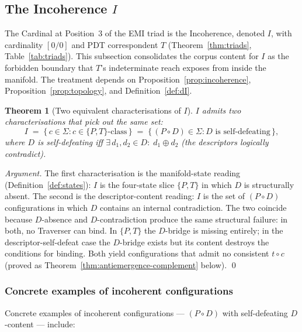 \documentclass[11pt,a4paper]{article}
\newtheorem{theorem}{Theorem}[section]
\theoremstyle{definition}
\theoremstyle{remark}
\begin{document}
\subsection{The Incoherence $I$}\label{subsec:incoherence}

The Cardinal at Position~3 of the EMI triad is the Incoherence, denoted $I$, with cardinality $[0/0]$ and PDT correspondent $T$ (Theorem~\ref{thm:triads}, Table~\ref{tab:triads}). This subsection consolidates the corpus content for $I$ as the forbidden boundary that $T$'s indeterminate reach exposes from inside the manifold. The treatment depends on Proposition~\ref{prop:incoherence}, Proposition~\ref{prop:topology}, and Definition~\ref{def:dI}.

\begin{theorem}[Two equivalent characterisations of $I$]\label{thm:incoherence-equivalence}
$I$ admits two characterisations that pick out the same set:
\[
I \;=\; \{\,c \in \Sigma : c \in \{P,T\}\text{-class}\,\} \;=\; \{\,(P\circ D) \in \Sigma : D \text{ is self-defeating}\,\},
\]
where $D$ is self-defeating iff $\exists\, d_{1}, d_{2} \in D :\; d_{1} \oplus d_{2}$ (the descriptors logically contradict).
\end{theorem}

\begin{proof}[Argument]
The first characterisation is the manifold-state reading (Definition~\ref{def:states}): $I$ is the four-state slice $\{P, T\}$ in which $D$ is structurally absent. The second is the descriptor-content reading: $I$ is the set of $(P\circ D)$ configurations in which $D$ contains an internal contradiction. The two coincide because $D$-absence and $D$-contradiction produce the same structural failure: in both, no Traverser can bind. In $\{P,T\}$ the $D$-bridge is missing entirely; in the descriptor-self-defeat case the $D$-bridge exists but its content destroys the conditions for binding. Both yield configurations that admit no consistent $t \circ c$ (proved as Theorem~\ref{thm:antiemergence-complement} below). \qed
\end{proof}

\subsubsection{Concrete examples of incoherent configurations}\label{subsubsec:incoherence-examples}

Concrete examples of incoherent configurations --- $(P \circ D)$ with self-defeating $D$-content --- include:
\end{document}

